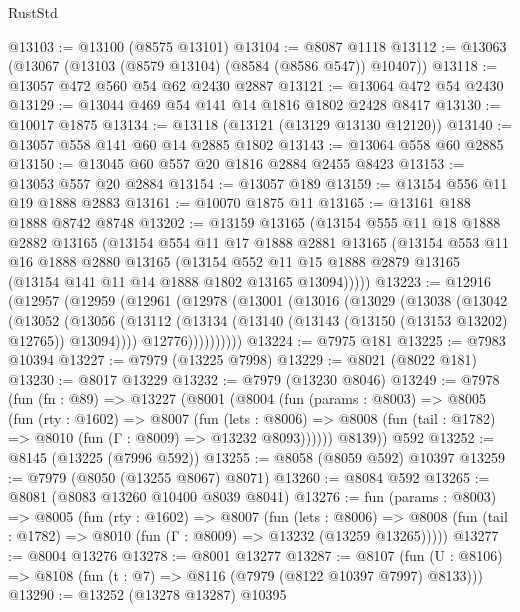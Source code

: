\begin{lexlean}{RustStd}
\begin{coremodule}
@13103 := @13100 (@8575 @13101)
@13104 := @8087 @1118
@13112 := @13063 (@13067 (@13103 (@8579 @13104) (@8584 (@8586 @547)) @10407))
@13118 := @13057 @472 @560 @54 @62 @2430 @2887
@13121 := @13064 @472 @54 @2430
@13129 := @13044 @469 @54 @141 @14 @1816 @1802 @2428 @8417
@13130 := @10017 @1875
@13134 := @13118 (@13121 (@13129 @13130 @12120))
@13140 := @13057 @558 @141 @60 @14 @2885 @1802
@13143 := @13064 @558 @60 @2885
@13150 := @13045 @60 @557 @20 @1816 @2884 @2455 @8423
@13153 := @13053 @557 @20 @2884
@13154 := @13057 @189
@13159 := @13154 @556 @11 @19 @1888 @2883
@13161 := @10070 @1875 @11
@13165 := @13161 @188 @1888 @8742 @8748
@13202 := @13159
    @13165
    (@13154
      @555
      @11
      @18
      @1888
      @2882
      @13165
      (@13154
        @554
        @11
        @17
        @1888
        @2881
        @13165
        (@13154
          @553
          @11
          @16
          @1888
          @2880
          @13165
          (@13154
            @552
            @11
            @15
            @1888
            @2879
            @13165
            (@13154 @141 @11 @14 @1888 @1802 @13165 @13094)))))
@13223 := @12916
    (@12957
      (@12959
        (@12961
          (@12978
            (@13001
              (@13016
                (@13029
                  (@13038
                    (@13042
                      (@13052
                        (@13056
                          (@13112
                            (@13134 (@13140 (@13143 (@13150 (@13153 @13202) @12765)) @13094))))
                        @12776))))))))))
@13224 := @7975 @181
@13225 := @7983 @10394
@13227 := @7979 (@13225 @7998)
@13229 := @8021 (@8022 @181)
@13230 := @8017 @13229
@13232 := @7979 (@13230 @8046)
@13249 := @7978
    (fun (fn : @89) =>
    @13227
      (@8001
        (@8004
          (fun (params : @8003) =>
          @8005
            (fun (rty : @1602) =>
            @8007
              (fun (lets : @8006) =>
              @8008 (fun (tail : @1782) => @8010 (fun (Γ : @8009) => @13232 @8093))))))
        @8139))
    @592
@13252 := @8145 (@13225 (@7996 @592))
@13255 := @8058 (@8059 @592) @10397
@13259 := @7979 (@8050 (@13255 @8067) @8071)
@13260 := @8084 @592
@13265 := @8081 (@8083 @13260 @10400 @8039 @8041)
@13276 := fun (params : @8003) =>
  @8005
    (fun (rty : @1602) =>
    @8007
      (fun (lets : @8006) =>
      @8008 (fun (tail : @1782) => @8010 (fun (Γ : @8009) => @13232 (@13259 @13265)))))
@13277 := @8004 @13276
@13278 := @8001 @13277
@13287 := @8107
    (fun (U : @8106) => @8108 (fun (t : @7) => @8116 (@7979 (@8122 @10397 @7997) @8133)))
@13290 := @13252 (@13278 @13287) @10395

\end{coremodule}
\end{lexlean}
